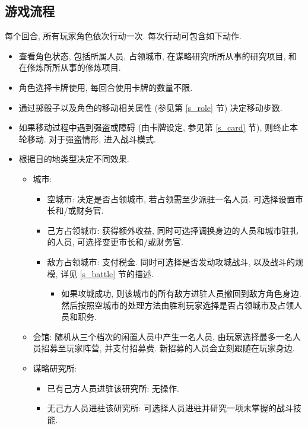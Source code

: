 \documentclass[UTF8, zihao=-4]{ctexart} %
\begin{document}
\subsection{游戏流程}
\label{s_process}
每个回合, 所有玩家角色依次行动一次. 每次行动可包含如下动作.
\begin{itemize}
    \item 查看角色状态, 包括所属人员, 占领城市, 在谋略研究所所从事的研究项目, 和在修炼所所从事的修炼项目.
    \item 角色选择卡牌使用, 每回合使用卡牌的数量不限. 
    \item 通过掷骰子以及角色的移动相关属性 (参见第 \ref{s_role} 节) 决定移动步数. 
    \item 如果移动过程中遇到强盗或障碍 (由卡牌设定, 参见第 \ref{s_card} 节), 则终止本轮移动. 对于强盗情形, 进入战斗模式.
    \item 根据目的地类型决定不同效果.
        \begin{itemize}
            \item 城市:
                \begin{itemize}
                    \item 空城市: 决定是否占领城市, 若占领需至少派驻一名人员. 可选择设置市长和/或财务官.
                    \item 己方占领城市: 获得额外收益, 同时可选择调换身边的人员和城市驻扎的人员, 可选择变更市长和/或财务官.
                    \item 敌方占领城市: 支付税金. 同时可选择是否发动攻城战斗, 以及战斗的规模, 详见 \ref{s_battle} 节的描述.
                        \begin{itemize}
                            \item 如果攻城成功, 则该城市的所有敌方进驻人员撤回到敌方角色身边. 
                                然后按照空城市的处理方法由胜利玩家选择是否占领城市及占领人员和职务.
                        \end{itemize}
                \end{itemize}
            \item 会馆: 随机从三个档次的闲置人员中产生一名人员, 由玩家选择最多一名人员招募至玩家阵营, 并支付招募费.
                新招募的人员会立刻跟随在玩家身边.
            \item 谋略研究所:
                \begin{itemize}
                    \item 已有己方人员进驻该研究所: 无操作.
                    \item 无己方人员进驻该研究所: 可选择人员进驻并研究一项未掌握的战斗技能.

\end{itemize}
\end{itemize}
\end{itemize}
\end{document}
